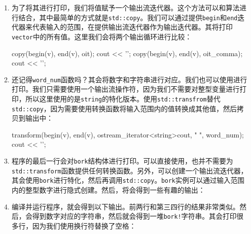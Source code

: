\begin{enumerate}
\item 为了将其进行打印，我们将值赋予一个输出流迭代器。这个方法可以和算法进行结合，其中最简单的方式就是\texttt{std::copy}。我们可以通过提供\texttt{begin}和\texttt{end}迭代器来代表输入的范围，在提供输出流迭代器作为输出迭代器。其将打印\texttt{vector}中的所有值。这里我们会将两个输出循环进行比较：

\begin{codebox}[cpp]
    copy(begin(v), end(v), oit);
    cout << '\n';
    copy(begin(v), end(v), oit_comma);
    cout << '\n';
\end{codebox}

\item 还记得\texttt{word\_num}函数吗？其会将数字和字符串进行对应。我们也可以使用进行打印。我们只需要使用一个输出流操作符，因为我们不需要对整型变量进行打印，所以这里使用的是\texttt{string}的特化版本。使用\texttt{std::transfrom}替代\texttt{std::copy}，因为需要使用转换函数将输入范围内的值转换成其他值，然后拷贝到输出中：

\begin{codebox}[cpp]
transform(begin(v), end(v),
         ostream_iterator<string>{cout, " "}, word_num);
cout << '\n';
\end{codebox}

\item 程序的最后一行会对\texttt{bork}结构体进行打印。可以直接使用，也并不需要为\texttt{std::transform}函数提供任何转换函数。另外，可以创建一个输出流迭代器，其会使用\texttt{bork}进行特化，然后再调用\texttt{std::copy}。\texttt{bork}实例可以通过输入范围内的整型数字进行隐式创建。然后，将会得到一些有趣的输出：

\begin{codebox}[cpp]
    copy(begin(v), end(v),
         ostream_iterator<bork>{cout, "\n"});
}
\end{codebox}

\item 编译并运行程序，就会得到以下输出。前两行和第三四行的结果非常类似。然后，会得到数字对应的字符串，然后就会得到一堆\texttt{bork!}字符串。其会打印很多行，因为我们使用换行符替换了空格：


\end{enumerate}

